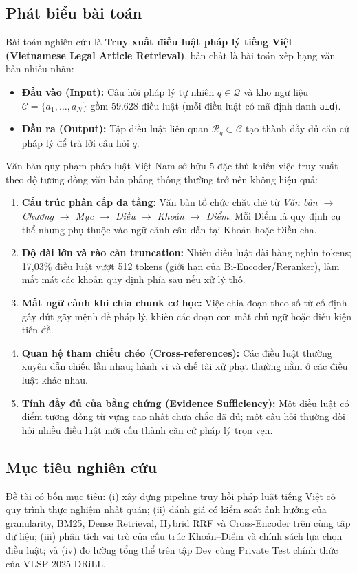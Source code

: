 \documentclass[12pt,a4paper]{article}
\begin{document}
\subsection{Phát biểu bài toán}
Bài toán nghiên cứu là \textbf{Truy xuất điều luật pháp lý tiếng Việt (Vietnamese Legal Article Retrieval)}, bản chất là bài toán xếp hạng văn bản nhiều nhãn:
\begin{itemize}[leftmargin=0.6cm]
    \item \textbf{Đầu vào (Input):} Câu hỏi pháp lý tự nhiên $q \in \mathcal{Q}$ và kho ngữ liệu $\mathcal{C} = \{a_1, \dots, a_N\}$ gồm $59.628$ điều luật (mỗi điều luật có mã định danh \texttt{aid}).
    \item \textbf{Đầu ra (Output):} Tập điều luật liên quan $\mathcal{R}_q \subset \mathcal{C}$ tạo thành đầy đủ căn cứ pháp lý để trả lời câu hỏi $q$.
\end{itemize}

Văn bản quy phạm pháp luật Việt Nam sở hữu 5 đặc thù khiến việc truy xuất theo độ tương đồng văn bản phẳng thông thường trở nên không hiệu quả:
\begin{enumerate}[leftmargin=0.6cm]
    \item \textbf{Cấu trúc phân cấp đa tầng:} Văn bản tổ chức chặt chẽ từ \textit{Văn bản $\rightarrow$ Chương $\rightarrow$ Mục $\rightarrow$ Điều $\rightarrow$ Khoản $\rightarrow$ Điểm}. Mỗi Điểm là quy định cụ thể nhưng phụ thuộc vào ngữ cảnh câu dẫn tại Khoản hoặc Điều cha.
    \item \textbf{Độ dài lớn và rào cản truncation:} Nhiều điều luật dài hàng nghìn tokens; 17,03\% điều luật vượt 512 tokens (giới hạn của Bi-Encoder/Reranker), làm mất mát các khoản quy định phía sau nếu xử lý thô.
    \item \textbf{Mất ngữ cảnh khi chia chunk cơ học:} Việc chia đoạn theo số từ cố định gây đứt gãy mệnh đề pháp lý, khiến các đoạn con mất chủ ngữ hoặc điều kiện tiền đề.
    \item \textbf{Quan hệ tham chiếu chéo (Cross-references):} Các điều luật thường xuyên dẫn chiếu lẫn nhau; hành vi và chế tài xử phạt thường nằm ở các điều luật khác nhau.
    \item \textbf{Tính đầy đủ của bằng chứng (Evidence Sufficiency):} Một điều luật có điểm tương đồng từ vựng cao nhất chưa chắc đã đủ; một câu hỏi thường đòi hỏi nhiều điều luật mới cấu thành căn cứ pháp lý trọn vẹn.
\end{enumerate}

\subsection{Mục tiêu nghiên cứu}
Đề tài có bốn mục tiêu: (i) xây dựng pipeline truy hồi pháp luật tiếng Việt có quy trình thực nghiệm nhất quán; (ii) đánh giá có kiểm soát ảnh hưởng của granularity, BM25, Dense Retrieval, Hybrid RRF và Cross-Encoder trên cùng tập dữ liệu; (iii) phân tích vai trò của cấu trúc Khoản--Điểm và chính sách lựa chọn điều luật; và (iv) đo lường tổng thể trên tập Dev cùng Private Test chính thức của VLSP 2025 DRiLL.
\end{document}
